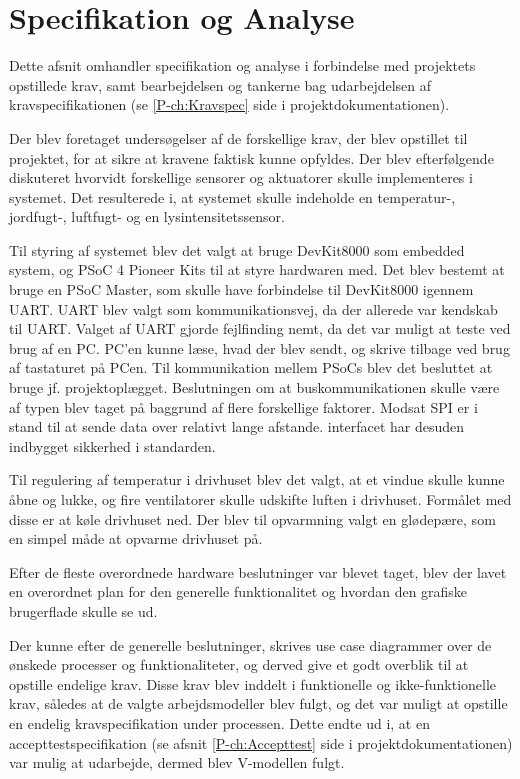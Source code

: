 \section{Specifikation og Analyse}
\label{ch:Specifikation_og_Analyse}
Dette afsnit omhandler specifikation og analyse i forbindelse med projektets opstillede krav, samt bearbejdelsen og tankerne bag udarbejdelsen af kravspecifikationen (se \ref{P-ch:Kravspec}  side \pageref{P-ch:Kravspec} i projektdokumentationen).

\mbox{}

Der blev foretaget undersøgelser af de forskellige krav, der blev opstillet til projektet, for at sikre at kravene faktisk kunne opfyldes. Der blev efterfølgende diskuteret hvorvidt forskellige sensorer og aktuatorer skulle implementeres i systemet. Det resulterede i, at systemet skulle indeholde en temperatur-, jordfugt-, luftfugt- og en lysintensitetssensor.

Til styring af systemet blev det valgt at bruge DevKit8000 som embedded system, og PSoC 4 Pioneer Kits til at styre hardwaren med. Det blev bestemt at bruge en PSoC Master, som skulle have forbindelse til DevKit8000 igennem UART. UART blev valgt som kommunikationsvej, da der allerede var kendskab til UART. Valget af UART gjorde fejlfinding nemt, da det var muligt at teste ved brug af en PC. PC'en kunne læse, hvad der blev sendt, og skrive tilbage ved brug af tastaturet på PCen.
Til kommunikation mellem PSoCs blev det besluttet at bruge \IIC jf. projektoplægget.
Beslutningen om at buskommunikationen skulle være af typen \IIC blev taget på baggrund af flere forskellige faktorer. Modsat SPI er \IIC i stand til at sende data over relativt lange afstande. \IIC interfacet har desuden indbygget sikkerhed i standarden.

Til regulering af temperatur i drivhuset blev det valgt, at et vindue skulle kunne åbne og lukke, og fire ventilatorer skulle udskifte luften i drivhuset. Formålet med disse er at køle drivhuset ned. Der blev til opvarmning valgt en glødepære, som en simpel måde at opvarme drivhuset på.

Efter de fleste overordnede hardware beslutninger var blevet taget, blev der lavet en overordnet plan for den generelle funktionalitet og hvordan den grafiske brugerflade skulle se ud.

Der kunne efter de generelle beslutninger, skrives use case diagrammer over de ønskede processer og funktionaliteter, og derved give et godt overblik til at opstille endelige krav. Disse krav blev inddelt i funktionelle og ikke-funktionelle krav, således at de valgte arbejdsmodeller blev fulgt, og det var muligt at opstille en endelig kravspecifikation under processen. Dette endte ud i, at en accepttestspecifikation (se afsnit \ref{P-ch:Accepttest}  side \pageref{P-ch:Accepttest} i projektdokumentationen) var mulig at udarbejde, dermed blev V-modellen fulgt.

\clearpage